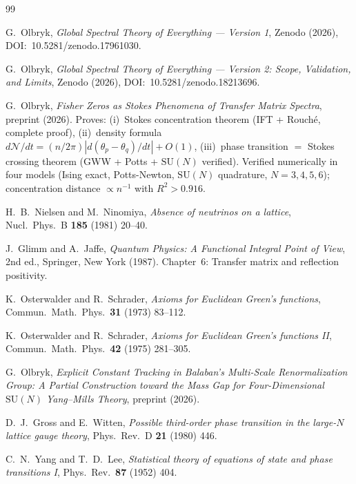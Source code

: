 \documentclass[12pt]{article}
\theoremstyle{definition}
\theoremstyle{remark}
\newcommand{\SU}{\mathrm{SU}}
\begin{document}
\begin{thebibliography}{99}

G.~Olbryk,
\emph{Global Spectral Theory of Everything --- Version 1},
Zenodo (2026), DOI:~10.5281/zenodo.17961030.

G.~Olbryk,
\emph{Global Spectral Theory of Everything --- Version 2:
Scope, Validation, and Limits},
Zenodo (2026), DOI:~10.5281/zenodo.18213696.

G.~Olbryk,
\emph{Fisher Zeros as Stokes Phenomena of Transfer Matrix Spectra},
preprint (2026).
Proves: (i)~Stokes concentration theorem (IFT + Rouch\'e, complete proof),
(ii)~density formula $d\mathcal{N}/dt = (n/2\pi)|d(\theta_p-\theta_q)/dt| + O(1)$,
(iii)~phase transition $=$ Stokes crossing theorem (GWW + Potts + $\SU(N)$ verified).
Verified numerically in four models (Ising exact, Potts-Newton, $\SU(N)$ quadrature,
$N=3,4,5,6$); concentration distance $\propto n^{-1}$ with $R^2 > 0.916$.

H.~B.~Nielsen and M.~Ninomiya,
\emph{Absence of neutrinos on a lattice},
Nucl.\ Phys.\ B \textbf{185} (1981) 20--40.

J.~Glimm and A.~Jaffe,
\emph{Quantum Physics: A Functional Integral Point of View},
2nd ed., Springer, New York (1987).  Chapter~6: Transfer matrix and
reflection positivity.

K.~Osterwalder and R.~Schrader,
\emph{Axioms for Euclidean Green's functions},
Commun.\ Math.\ Phys.\ \textbf{31} (1973) 83--112.

K.~Osterwalder and R.~Schrader,
\emph{Axioms for Euclidean Green's functions II},
Commun.\ Math.\ Phys.\ \textbf{42} (1975) 281--305.

G.~Olbryk,
\emph{Explicit Constant Tracking in Balaban's Multi-Scale
Renormalization Group: A Partial Construction toward the Mass Gap
for Four-Dimensional $\SU(N)$ Yang--Mills Theory},
preprint (2026).

D.~J.~Gross and E.~Witten,
\emph{Possible third-order phase transition in the large-$N$ lattice
gauge theory},
Phys.\ Rev.\ D \textbf{21} (1980) 446.

C.~N.~Yang and T.~D.~Lee,
\emph{Statistical theory of equations of state and phase transitions I},
Phys.\ Rev.\ \textbf{87} (1952) 404.


\end{thebibliography}
\end{document}
